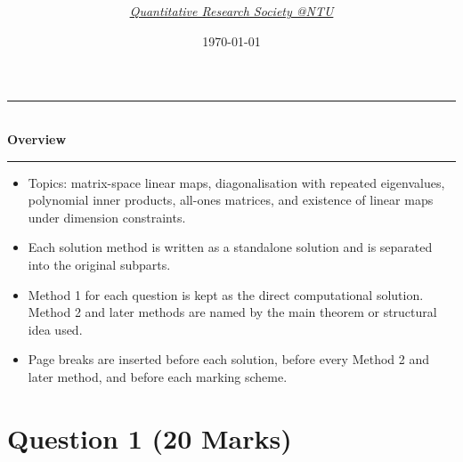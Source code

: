 \documentclass[12pt]{article}
\title{
\Huge \CourseCode\ \CourseName \\[0.3em]
\Large \DocType  \\[0.3em]
\large \ExamMeta
}
\author{
  \textit{\href{https://qrsntu.org}{Quantitative Research Society @NTU}}
}
\date{\today}
\newenvironment{overview}{
  \par\bigskip
  \begin{center}
    \rule{0.92\linewidth}{0.6pt}\\[-0.2em]
    \textbf{Overview}\\[-0.2em]
    \rule{0.92\linewidth}{0.6pt}
  \end{center}
  \vspace{-0.3em}
  \begin{itemize}[leftmargin=1.6em, itemsep=0.2em, topsep=0.2em]
}{
  \end{itemize}
  \par\bigskip
}
\begin{document}
\maketitle
\thispagestyle{plainfirst}
\pagestyle{main}

\begin{overview}
  \item Topics: matrix-space linear maps, diagonalisation with repeated eigenvalues, polynomial inner products, all-ones matrices, and existence of linear maps under dimension constraints.
  \item Each solution method is written as a standalone solution and is separated into the original subparts.
  \item Method 1 for each question is kept as the direct computational solution. Method 2 and later methods are named by the main theorem or structural idea used.
  \item Page breaks are inserted before each solution, before every Method 2 and later method, and before each marking scheme.
\end{overview}

\newpage
\tableofcontents
\newpage

\section{Question 1 \hfill (20 Marks)}
\end{document}
